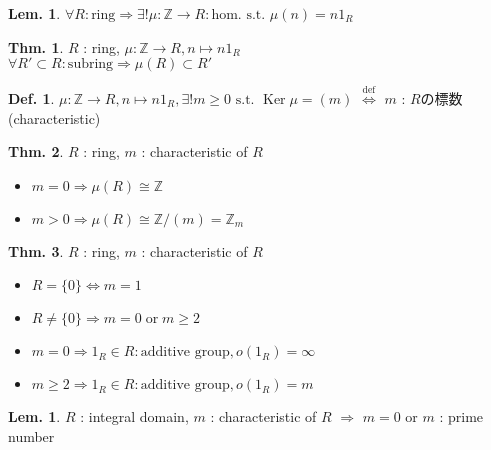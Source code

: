 \documentclass[uplatex,dvipdfmx,9pt]{beamer}
\newcommand{\defarrow}{\overset{\mathrm{def}}{\Leftrightarrow}}
\newcommand{\st}{\text{ s.t. }}
\newcommand{\Ker}{\operatorname{Ker}}
\newcounter{textLemCount}
\theoremstyle{definition} %
\newtheorem{defn}{Def.}[subsection] %
\newtheorem{thm}{Thm.}[subsection] %
\newtheorem{lemText}[textLemCount]{Lem.} %
\theoremstyle{example}
\begin{document}
    \begin{frame}

      \begin{lemText}
        $\forall R : \text{ring} \Rightarrow \exists! \mu\colon \mathbb{Z} \to R : \text{hom.} \st \mu(n) = n1_R$ 
      \end{lemText}

      \begin{thm}
        $R$ : ring, $\mu\colon \mathbb{Z} \to R, n \mapsto n1_R$ \\
        $\forall R' \subset R : \text{subring} \Rightarrow \mu(R) \subset R'$
      \end{thm}

      \begin{defn}
        $\mu\colon \mathbb{Z} \to R, n \mapsto n1_R, \exists! m \ge 0 \st \Ker\mu = (m)$ $\defarrow$ $m$ : $R$の\alert{標数(characteristic)}
      \end{defn}

      \begin{thm}
        $R$ : ring, $m$ : characteristic of $R$
        \begin{itemize}
          \item $m = 0 \Rightarrow \mu(R) \cong \mathbb{Z}$
          \item $m > 0 \Rightarrow \mu(R) \cong \mathbb{Z}/(m) = \mathbb{Z}_m$
        \end{itemize}
      \end{thm}
      
    \end{frame}

    \begin{frame}

     \begin{thm}
      $R$ : ring, $m$ : characteristic of $R$
      \begin{itemize}
        \item $R = \{0\} \Leftrightarrow m = 1$
        \item $R \neq \{0\} \Rightarrow m = 0 \; \text{or} \; m \ge 2$
        \item $m = 0 \Rightarrow 1_R \in R : \text{additive group}, o(1_R) = \infty$
        \item $m \ge 2 \Rightarrow 1_R \in R : \text{additive group}, o(1_R) = m$
      \end{itemize}
    \end{thm} 

    \begin{lemText}
      $R$ : integral domain, $m$ : characteristic of $R$ $\Rightarrow$ $m = 0$ or $m$ : prime number
    \end{lemText}

    \end{frame}
\end{document}
